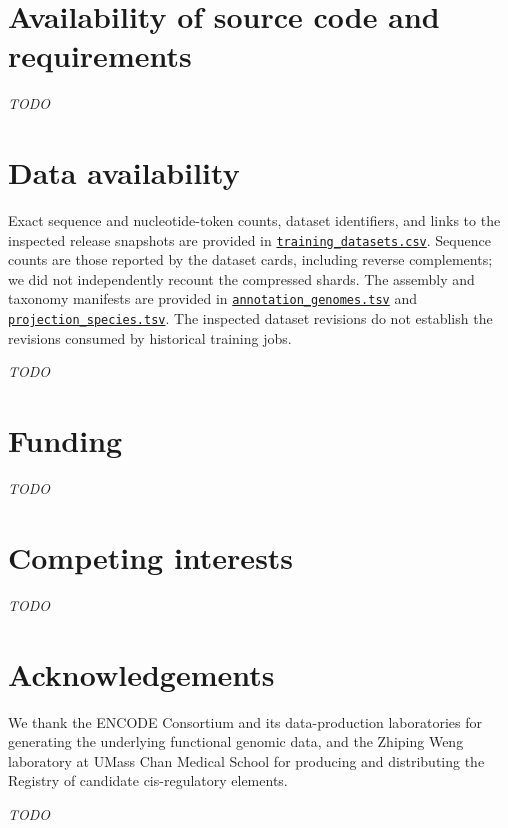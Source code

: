 \documentclass[a4paper,num-refs]{oup-contemporary}
\newcommand{\todo}{\par\noindent\textit{TODO}\par}
\begin{document}
\section{Availability of source code and requirements}
\todo
\section{Data availability}
Exact sequence and nucleotide-token counts, dataset identifiers, and links
to the inspected release snapshots are provided in
\href{https://github.com/Open-Athena/marin-dna-paper/blob/main/data/dataset_provenance/training_datasets.csv}{\texttt{training\_datasets.csv}}.
Sequence counts are those reported by the dataset cards, including reverse
complements; we did not independently recount the compressed shards.
The assembly and taxonomy manifests are provided in
\href{https://github.com/Open-Athena/marin-dna-paper/blob/main/data/dataset_provenance/annotation_genomes.tsv}{\texttt{annotation\_genomes.tsv}}
and
\href{https://github.com/Open-Athena/marin-dna-paper/blob/main/data/dataset_provenance/projection_species.tsv}{\texttt{projection\_species.tsv}}.
The inspected dataset revisions do not establish the revisions consumed by
historical training jobs.
\todo
\section{Funding}
\todo
\section{Competing interests}
\todo
\section{Acknowledgements}
We thank the ENCODE Consortium and its data-production laboratories for
generating the underlying functional genomic data, and the Zhiping Weng
laboratory at UMass Chan Medical School for producing and distributing
the Registry of candidate cis-regulatory elements.
\todo

\clearpage
{}%
\end{document}
